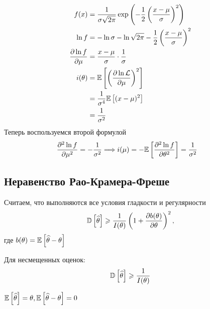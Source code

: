 \documentclass[a4paper, 10pt]{article}
\begin{document}
\begin{equation*}
    \begin{aligned}
        f(x)&=\frac{1}{\sigma\sqrt{2\pi}}\exp\left(-\frac{1}{2}\left(\frac{x-\mu}{\sigma}\right)^2\right)\\
        \ln f&=-\ln \sigma-\ln\sqrt{2\pi}-\frac{1}{2}\left(\frac{x-\mu}{\sigma}\right)^2\\
        \frac{\partial\ln f}{\partial\mu}&=\frac{x-\mu}{\sigma}\cdot\frac{1}{\sigma}\\
        i(\theta)&=\mathbb{E}\left[\left(\frac{\partial\ln\mathcal{L}}{\partial\mu}\right)^2\right]\\
        &=\frac{1}{\sigma^4}\mathbb{E}\left[(x-\mu)^2\right]\\
        &=\frac{1}{\sigma^2}
    \end{aligned}
\end{equation*}
Теперь воспользуемся второй формулой
\begin{equation*}
    \begin{aligned}
        \frac{\partial^2\ln f}{\partial\mu^2}&=-\frac{1}{\sigma^2}\Longrightarrow i(\mu)=-\mathbb{E}\left[\frac{\partial^2\ln f}{\partial\theta^2}\right]=\frac{1}{\sigma^2}
    \end{aligned}
\end{equation*}

\subsection{Неравенство Рао-Крамера-Фреше}
 Считаем, что выполняются все условия гладкости и регулярности
\begin{equation*}
    \mathbb{D}\left[\widehat{\theta}\right]\geqslant\frac{1}{I(\theta)}\left(1+\frac{\partial b(\theta)}{\partial\theta}\right)^2,
\end{equation*}
где $b(\theta)=\mathbb{E}\left[\widehat{\theta}-\theta\right]$

Для несмещенных оценок:
\begin{equation*}
    \mathbb{D}\left[\widehat{\theta}\right]\geqslant\frac{1}{I(\theta)}
\end{equation*}

\proof $\mathbb{E}\left[\widehat{\theta}\right]=\theta,\mathbb{E}\left[\widehat{\theta}-\theta\right]=0$
\end{document}
